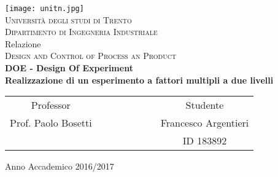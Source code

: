 \begin{titlepage}
 \begin{center}
 \texttt{[image: unitn.jpg]}\\
 \vspace{1em}
 {\Large \textsc{Università degli studi di Trento}}\\
 \vspace{1em}
 {\Large \textsc{Dipartimento di Ingegneria Industriale}}\\
 \vspace{4em}
 {\normalsize Relazione}\\
 \vspace{1em}
 {\Large \textsc{Design and Control of Process an Product}}\\
 \vspace{4em}
 {\LARGE\textbf{
 	DOE - Design Of Experiment\\[0.2cm]
 	Realizzazione di un esperimento a fattori multipli a due livelli
 }}\\
 \end{center}

\vskip 2.0cm
 \begin{center}
 \begin{tabular}{c c c c c c c c}
 Professor & & & & & & & Studente \\[0.2cm]
 \large{Prof. Paolo Bosetti} & & & & & & & \large{Francesco Argentieri}\\[0.4cm]
  & & & & & & & ID 183892\\[0.2cm]
 \end{tabular}
 \end{center}

\vskip 2.5cm
\begin{center}
{\normalsize Anno Accademico 2016/2017}
\end{center}
\end{titlepage}

\clearpage{\pagestyle{empty}\cleardoublepage}
